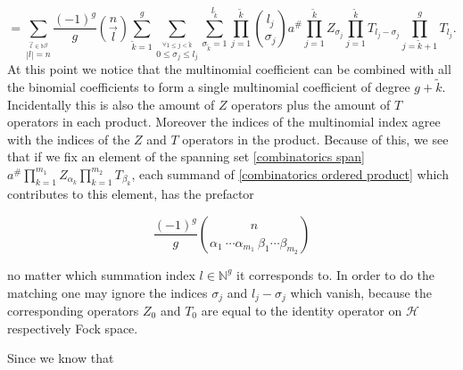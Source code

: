 \documentclass[b5paper,draft,openbib,12pt]{memoir}
\begin{document}
\begin{equation}\label{combinatorics ordered product}
=\!\!\! \sum_{\stackrel{\vec{l}\in\mathbb{N}^g}{|l|=n}} \!\!\frac{(-1)^g}{g}\! \binom{n}{\vec{l}}
\!\! \sum_{\tilde{k}=1}^g \!\sum_{\stackrel{\forall 1\le j <\tilde{k}}{0\le \sigma_{j}\le l_j}}
\!\sum_{\sigma_{\tilde{k}}=1}^{l_{\tilde{k}}} \prod_{j=1}^{\tilde{k}}\! \binom{l_j}{\sigma_j}
a^\# \prod_{j=1}^{\tilde{k}} Z_{\sigma_j} \prod_{j=1}^{\tilde{k}} T_{l_j-\sigma_j}
\!\!\prod_{j=\tilde{k}+1}^g T_{l_j}.
\end{equation}
At this point we notice that the multinomial coefficient can be combined with all
the binomial coefficients to form a single multinomial coefficient of degree
\(g+\tilde{k}\). Incidentally this is also the amount of \(Z\) operators plus the amount
of \(T\) operators in each product. Moreover the indices of the multinomial index
agree with the indices of the \(Z\) and \(T\) operators in the product. Because of 
this, we see that if we fix an element of the spanning set \eqref{combinatorics span}
\(a^\# \prod_{k=1}^{m_1} Z_{\alpha_k} \prod_{k=1}^{m_2}T_{\beta_k}\), each 
summand of \eqref{combinatorics ordered product} which contributes to
this element, has the prefactor

\begin{equation}
\frac{(-1)^g}{g} \binom{n}{\alpha_1 \ \cdots \alpha_{m_1} \ \beta_1 \cdots \beta_{m_2}}
\end{equation}

no matter which summation index \(l\in\mathbb{N}^g\) it corresponds to. In order
to do the matching one may ignore the indices \(\sigma_j\) and \(l_j-\sigma_j\) 
which vanish, because the corresponding operators \(Z_0\) and \(T_0\) are equal to
the identity operator on \(\mathcal{H}\) respectively Fock space. 

Since we know that 
\end{document}
